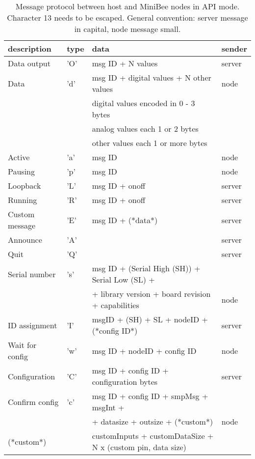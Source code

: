 \documentclass[letterpaper,10pt]{article}
\begin{document}
\begin{table}
 
\begin{center}
\begin{tabular}{llll}
description & type & data & sender\\
\hline
Data output & 'O' & msg ID + N values & server\\
Data & 'd' & msg ID + digital values + N other values & node\\
 & & digital values encoded in 0 - 3 bytes & \\
 & & analog values each 1 or 2 bytes & \\
 & & other values each 1 or more bytes & \\  
Active & 'a' & msg ID & node\\
Pausing & 'p' & msg ID & node\\
Loopback & 'L' & msg ID + onoff & server\\
Running & 'R' & msg ID + onoff & server\\
Custom message & 'E' & msg ID + (*data*) & server\\
\hline
Announce & 'A' &  & server \\
Quit & 'Q' &  & server \\
Serial number & 's' & msg ID + (Serial High (SH)) + Serial Low (SL) +& \\
			&	  & + library version + board revision + capabilities & node\\
ID assignment & 'I' & msgID + (SH) + SL + nodeID + (*config ID*) & server \\
Wait for config & 'w' & msg ID + nodeID + config ID & node \\
Configuration & 'C' & msg ID + config ID + configuration bytes & server \\
Confirm config & 'c' & msg ID + config ID + smpMsg + msgInt + & \\
                           &        & + datasize + outsize + (*custom*) & node \\
(*custom*) &  & customInputs + customDataSize + N x (custom pin, data size) & \\
\hline
\end{tabular}
\end{center}
\caption{Message protocol between host and MiniBee nodes in API mode. Character 13 needs to be escaped. General convention: server message in capital, node message small.}
\end{table}
\end{document}
